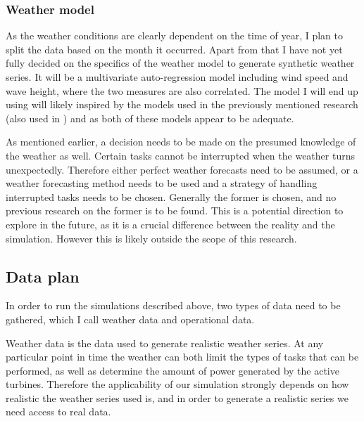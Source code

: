 \documentclass[a4paper,12pt]{article}
\begin{document}
\subsubsection{Weather model} \label{sss:wemo}
As the weather conditions are clearly dependent on the time of year, I plan to split the data based on the month it occurred. Apart from that I have not yet fully decided on the specifics of the weather model to generate synthetic weather series. It will be a multivariate auto-regression model including wind speed and wave height, where the two measures are also correlated. The model I will end up using will likely inspired by the models used in the previously mentioned research \cite{dinwoodie2014operational} (also used in \cite{barlow2018mixed}) and \cite{kerkhove2017optimised} as both of these models appear to be adequate.

As mentioned earlier, a decision needs to be made on the presumed knowledge of the weather as well. Certain tasks cannot be interrupted when the weather turns unexpectedly. Therefore either perfect weather forecasts need to be assumed, or a weather forecasting method needs to be used and a strategy of handling interrupted tasks needs to be chosen. Generally the former is chosen, and no previous research on the former is to be found. This is a potential direction to explore in the future, as it is a crucial difference between the reality and the simulation.  However this is likely outside the scope of this research. 


\subsection{Data plan} \label{ss:data}
In order to run the simulations described above, two types of data need to be gathered, which I call weather data and operational data.

\bigskip

Weather data is the data used to generate realistic weather series. At any particular point in time the weather can both limit the types of tasks that can be performed, as well as determine the amount of power generated by the active turbines. Therefore the applicability of our simulation strongly depends on how realistic the weather series used is, and in order to generate a realistic series we need access to real data. 
\end{document}
